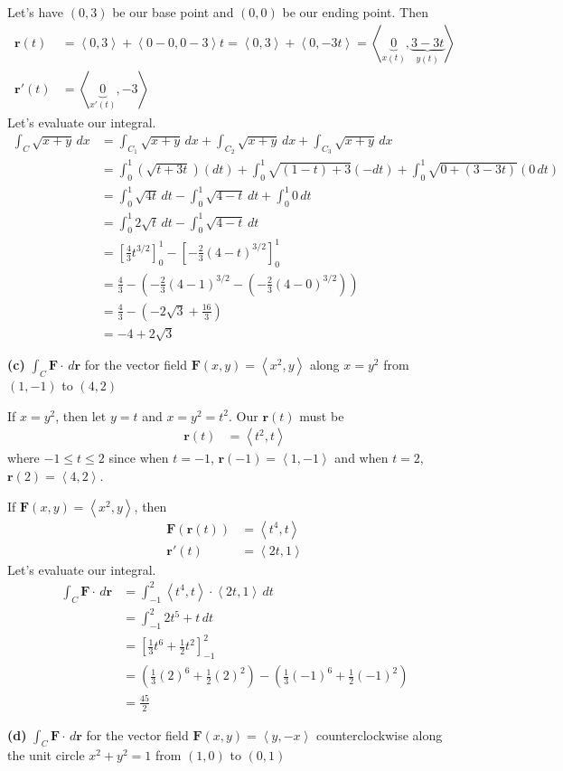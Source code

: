 \documentclass{article}
\newcommand{\lrp}[1]{\left( #1 \right)}
\newcommand{\lra}[1]{\left\langle #1 \right\rangle}
\newcommand{\lrb}[1]{\left[ #1 \right]}
\renewcommand{\r}[0]{\mathbf{r}}
\newcommand{\F}[0]{\mathbf{F}}
\begin{document}
Let's have $(0,3)$ be our base point and $(0,0)$ be our ending point. Then
\begin{align*}
    \r(t)&=\lra{0,3}+\lra{0-0,0-3}t=\lra{0,3}+\lra{0,-3t}=\lra{\underbrace{0}_{x(t)}, \underbrace{3-3t}_{y(t)}}\\
    \r'(t)&=\lra{\underbrace{0}_{x'(t)},-3}
\end{align*}
Let's evaluate our integral.
\begin{align*}
  \int_C \sqrt{x+y}\,dx &= \int_{C_1}\sqrt{x+y}\,dx+\int_{C_2}\sqrt{x+y}\,dx + \int_{C_3}\sqrt{x+y}\,dx\\
    &=\int_0^1 \lrp{\sqrt{t+3t}}\lrp{dt}+\int_0^1 \sqrt{(1-t)+3}\lrp{-dt}+\int_0^1 \sqrt{0+(3-3t)}\lrp{0\,dt}\\
    &=\int_0^1 \sqrt{4t}\,dt-\int_0^1 \sqrt{4-t}\,dt+\int_0^1 0\,dt\\
    &=\int_0^1 2\sqrt{t}\,dt-\int_0^1 \sqrt{4-t}\,dt\\
    &=\lrb{\frac{4}{3}t^{3/2}}_0^1 -\lrb{-\frac{2}{3}(4-t)^{3/2}}_0^1\\
    &=\frac{4}{3}-\lrp{-\frac{2}{3}(4-1)^{3/2}-\lrp{-\frac{2}{3}(4-0)^{3/2}}}\\
    &=\frac{4}{3}-\lrp{-2\sqrt{3}+\frac{16}{3}}\tag{use a calculator}\\
    &=\boxed{-4+2\sqrt{3}}
\end{align*}
{}\textbf{(c)} $\displaystyle \int_C \F \cdot\,d\r$ for the vector field $\F(x,y)=\lra{x^2,y}$ along $x=y^2$ from $(1,-1)$ to $(4,2)$

If $x=y^2$, then let $y=t$ and $x=y^2=t^2$. Our $\r(t)$ must be
\begin{align*}
    \r(t)&=\lra{t^2,t}
\end{align*}
where $-1\leq t \leq 2$ since when $t=-1$, $\r(-1)=\lra{1,-1}$ and when $t=2$, $\r(2)=\lra{4,2}$.

If $\F(x,y)=\lra{x^2,y}$, then
\begin{align*}
    \F(\r(t))&=\lra{t^4,t}\\
    \r'(t)&=\lra{2t,1}
\end{align*}
Let's evaluate our integral.
\begin{align*}
    \int_C \F\cdot\,d\r&=\int_{-1}^2 \lra{t^4,t}\cdot\lra{2t,1}\,dt\\
    &=\int_{-1}^2 2t^5 + t\,dt\\
    &=\lrb{\frac{1}{3}t^6+\frac{1}{2}t^2}_{-1}^2\\
    &=\lrp{\frac{1}{3}(2)^6+\frac{1}{2}(2)^2}-\lrp{\frac{1}{3}(-1)^6+\frac{1}{2}(-1)^2}\\
    &=\boxed{\frac{45}{2}}\tag{use a calculator}
\end{align*}
{}\textbf{(d)} $\displaystyle \int_C \F \cdot \,d\r$ for the vector field $\F(x,y)=\lra{y,-x}$ counterclockwise along the unit circle $x^2+y^2=1$ from $(1,0)$ to $(0,1)$
\end{document}
